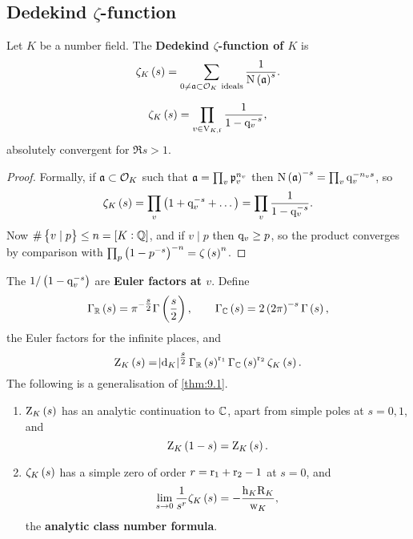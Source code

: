 \pagebreak

\subsection{Dedekind \texorpdfstring{$ \zeta $}{zeta}-function}

Let $ K $ be a number field. The \textbf{Dedekind $ \zeta $-function of $ K $} is
$$ \zeta_K\br{s} = \sum_{0 \ne \aaa \subset \OOO_K \ \text{ideals}} \dfrac{1}{\N\br{\aaa}^s}. $$

\begin{proposition}
\label{prop:9.2}
$$ \zeta_K\br{s} = \prod_{v \in \V_{K, \f}} \dfrac{1}{1 - \q_v^{-s}}, $$
absolutely convergent for $ \Re s > 1 $.
\end{proposition}

\begin{proof}
Formally, if $ \mathfrak{a} \subset \mathcal{O}_K $ such that $ \mathfrak{a} = \prod_v \mathfrak{p}_v^{n_v} $ then $ \N\br{\aaa}^{-s} = \prod_v \q_v^{-n_vs} $, so
$$ \zeta_K\br{s} = \prod_v \br{1 + \q_v^{-s} + \dots} = \prod_v \dfrac{1}{1 - \q_v^{-s}}. $$
Now $ \#\cbr{v \mid p} \le n = \sbr{K : \QQ} $, and if $ v \mid p $ then $ \mathrm{q}_v \ge p $, so the product converges by comparison with $ \prod_p \br{1 - p^{-s}}^{-n} = \zeta\br{s}^n $.
\end{proof}

The $ 1 / \br{1 - \q_v^{-s}} $ are \textbf{Euler factors at $ v $}. Define
$$ \Gamma_\RR\br{s} = \pi^{-\tfrac{s}{2}}\Gamma\br{\dfrac{s}{2}}, \qquad \Gamma_\CC\br{s} = 2\br{2\pi}^{-s}\Gamma\br{s}, $$
the Euler factors for the infinite places, and
$$ \Z_K\br{s} = \abs{\d_K}^{\tfrac{s}{2}}\Gamma_\RR\br{s}^{\r_1}\Gamma_\CC\br{s}^{\r_2}\zeta_K\br{s}. $$
The following is a generalisation of \ref{thm:9.1}.

\begin{theorem}
\hfill
\begin{enumerate}
\item $ \Z_K\br{s} $ has an analytic continuation to $ \mathbb{C} $, apart from simple poles at $ s = 0, 1 $, and
$$ \Z_K\br{1 - s} = \Z_K\br{s}. $$
\item $ \zeta_K\br{s} $ has a simple zero of order $ r = \mathrm{r}_1 + \mathrm{r}_2 - 1 $ at $ s = 0 $, and
\begin{equation}
\label{eq:8}
\lim_{s \to 0} \dfrac{1}{s^r}\zeta_K\br{s} = -\dfrac{\h_K\R_K}{\w_K},
\end{equation}
the \textbf{analytic class number formula}.
\end{enumerate}
\end{theorem}

